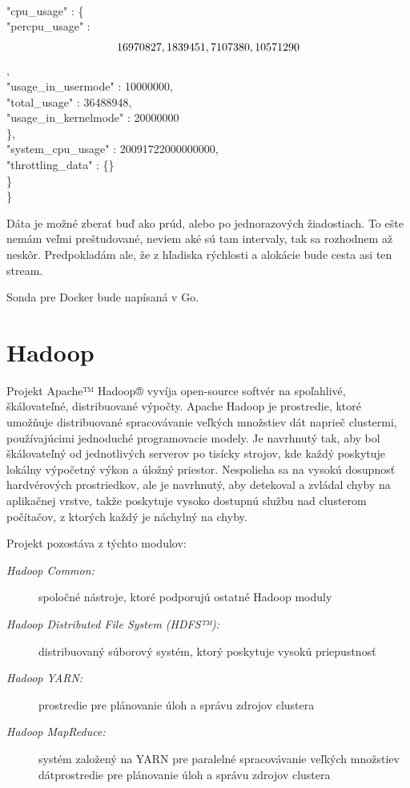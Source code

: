 \documentclass[11pt,final,oneside]{fithesis}
\begin{document}
\\        "cpu_usage" : \{
\\           "percpu_usage" : \[
\\              16970827,
\\              1839451,
\\              7107380,
\\              10571290
\\           \],
\\           "usage_in_usermode" : 10000000,
\\           "total_usage" : 36488948,
\\           "usage_in_kernelmode" : 20000000
\\        \},
\\        "system_cpu_usage" : 20091722000000000,
\\        "throttling_data" : \{\}
\\     \}
\\  \}
  
Dáta je možné zberať buď ako prúd, alebo po jednorazových žiadostiach. To ešte nemám veľmi preštudované, neviem aké sú tam intervaly, tak sa rozhodnem až neskôr.
Predpokladám ale, že z hľadiska rýchlosti a alokácie bude cesta asi ten stream.


Sonda pre Docker bude napísaná v Go.


\section{Hadoop}
Projekt Apache™ Hadoop® vyvíja open-source softvér na spoľahlivé, škálovateľné, distribuované výpočty. Apache Hadoop je prostredie, ktoré umožňuje distribuované spracovávanie veľkých množstiev dát
naprieč clustermi, používajúcimi jednoduché programovacie modely. Je navrhnutý tak, aby bol škálovateľný od jednotlivých serverov po tisícky strojov, kde každý poskytuje lokálny výpočetný výkon a úložný priestor.
Nespolieha sa na vysokú dosupnosť hardvérových prostriedkov, ale je navrhnutý, aby detekoval a zvládal chyby na aplikačnej vrstve, takže poskytuje vysoko dostupnú službu nad clusterom počítačov, z ktorých 
každý je náchylný na chyby.

Projekt pozostáva z týchto modulov:

\begin{description}
\item[\emph{Hadoop Common:}] spoločné nástroje, ktoré podporujú ostatné Hadoop moduly
\item[\emph{Hadoop Distributed File System (HDFS™):}] distribuovaný súborový systém, ktorý poskytuje vysokú priepustnosť
\item[\emph{Hadoop YARN:}] prostredie pre plánovanie úloh a správu zdrojov clustera
\item[\emph{Hadoop MapReduce:}] systém založený na YARN pre paralelné spracovávanie veľkých množstiev dátprostredie pre plánovanie úloh a správu zdrojov clustera
\end{description}
\end{document}
